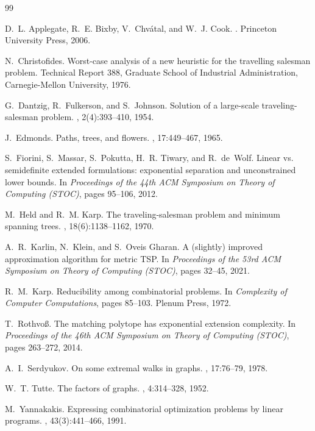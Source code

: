 \documentclass[11pt,a4paper]{article}
\renewcommand{\_}{\origunderscore\allowbreak}
\theoremstyle{plain}
\theoremstyle{definition}
\theoremstyle{remark}
\begin{document}
\begin{thebibliography}{99}

D.~L. Applegate, R.~E. Bixby, V.~Chv\'atal, and W.~J. Cook.
.
\newblock Princeton University Press, 2006.

N.~Christofides.
\newblock Worst-case analysis of a new heuristic for the travelling salesman problem.
\newblock Technical Report 388, Graduate School of Industrial Administration, Carnegie-Mellon University, 1976.

G.~Dantzig, R.~Fulkerson, and S.~Johnson.
\newblock Solution of a large-scale traveling-salesman problem.
, 2(4):393--410, 1954.

J.~Edmonds.
\newblock Paths, trees, and flowers.
, 17:449--467, 1965.

S.~Fiorini, S.~Massar, S.~Pokutta, H.~R. Tiwary, and R.~de~Wolf.
\newblock Linear vs. semidefinite extended formulations: exponential separation and unconstrained lower bounds.
\newblock In {\em Proceedings of the 44th ACM Symposium on Theory of Computing (STOC)}, pages 95--106, 2012.

M.~Held and R.~M. Karp.
\newblock The traveling-salesman problem and minimum spanning trees.
, 18(6):1138--1162, 1970.

A.~R.~Karlin, N.~Klein, and S.~Oveis Gharan.
\newblock A (slightly) improved approximation algorithm for metric TSP.
\newblock In {\em Proceedings of the 53rd ACM Symposium on Theory of Computing (STOC)}, pages 32--45, 2021.

R.~M.~Karp.
\newblock Reducibility among combinatorial problems.
\newblock In {\em Complexity of Computer Computations}, pages 85--103. Plenum Press, 1972.

T.~Rothvo\ss{}.
\newblock The matching polytope has exponential extension complexity.
\newblock In {\em Proceedings of the 46th ACM Symposium on Theory of Computing (STOC)}, pages 263--272, 2014.

A.~I.~Serdyukov.
\newblock On some extremal walks in graphs.
, 17:76--79, 1978.

W.~T. Tutte.
\newblock The factors of graphs.
, 4:314--328, 1952.

M.~Yannakakis.
\newblock Expressing combinatorial optimization problems by linear programs.
, 43(3):441--466, 1991.

\end{thebibliography}
\end{document}
